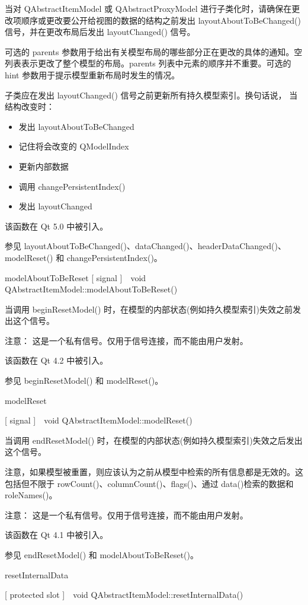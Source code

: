 当对 QAbstractItemModel 或 QAbstractProxyModel 进行子类化时，请确保在更改项顺序或更改要公开给视图的数据的结构之前发出 layoutAboutToBeChanged() 信号，并在更改布局后发出 layoutChanged() 信号。

可选的 parents 参数用于给出有关模型布局的哪些部分正在更改的具体的通知。空列表表示更改了整个模型的布局。parents 列表中元素的顺序并不重要。可选的 hint 参数用于提示模型重新布局时发生的情况。

子类应在发​​出 layoutChanged() 信号之前更新所有持久模型索引。换句话说，
当结构改变时：

\begin{itemize}
\item 发出 layoutAboutToBeChanged
\item 记住将会改变的 QModelIndex
\item 更新内部数据
\item 调用 changePersistentIndex()
\item 发出 layoutChanged
\end{itemize}

该函数在 Qt 5.0 中被引入。

参见 layoutAboutToBeChanged()、dataChanged()、headerDataChanged()、modelReset() 和 changePersistentIndex()。

modelAboutToBeReset
[ signal ] void QAbstractItemModel::modelAboutToBeReset()

当调用 beginResetModel() 时，在模型的内部状态(例如持久模型索引)失效之前发出这个信号。

注意： 这是一个私有信号。仅用于信号连接，而不能由用户发射。

该函数在 Qt 4.2 中被引入。

参见 beginResetModel() 和 modelReset()。

modelReset

[ signal ] void QAbstractItemModel::modelReset()

当调用 endResetModel() 时，在模型的内部状态(例如持久模型索引)失效之后发出这个信号。

注意，如果模型被重置，则应该认为之前从模型中检索的所有信息都是无效的。这包括但不限于 rowCount()、columnCount()、flags()、通过 data()检索的数据和 roleNames()。

注意： 这是一个私有信号。仅用于信号连接，而不能由用户发射。

该函数在 Qt 4.1 中被引入。

参见 endResetModel() 和 modelAboutToBeReset()。

resetInternalData

[ protected slot ] void QAbstractItemModel::resetInternalData()

